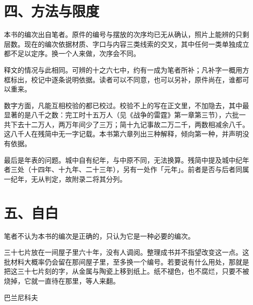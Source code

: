 \section*{四、方法与限度}

本书的编次出自笔者。原件的编号与摆放的次序均已无从确认，照片上能辨的只剩层数。现在的编次依据材质、字口与内容三类线索的交叉，其中任何一类单独成立都不足以定序。换一个人来做，次序会不同。

释文的情况与此相同。可辨的十之六七中，约有一成为笔者所补；凡补字一概用方框标出，校记中逐条说明依据。读者可以不同意，也可以另补，原件尚在，谁都可以重来。

数字方面，凡能互相校验的都已校过。校验不上的写在正文里，不加隐去，其中最显著的是八千之数：完工时十五万人（见《战争的雷霆》第一章第三节），六批一共下去十二万人，两万年间少了三万；简十九记事故二万二千，两数相减余八千。这八千人在残简中无一字记载。本书第六章列出三种解释，倾向第一种，并声明没有依据。

最后是年表的问题。城中自有纪年，与中原不同，无法换算。残简中提及城中纪年者三处（十四年、十九年、二十三年），另有一处作「元年」。前者是否与后者同属一纪年，无从判定，故附录二将其分列。

\section*{五、自白}

笔者不认为本书的编次是正确的，只认为它是一种必要的编次。

三十七片放在一间屋子里六十年，没有人调阅。整理成书并不指望改变这一点。这批材料大概率仍会留在那间屋子里，至多换一个编号。若要说有什么用处，那就是把这三十七片刻的字，从金属与陶瓷上移到纸上。纸不褪色，也不腐烂，只要不被烧掉，它就一直待在那里，等人来翻。

\begin{flushright}
{\small 巴兰尼科夫}
\end{flushright}
